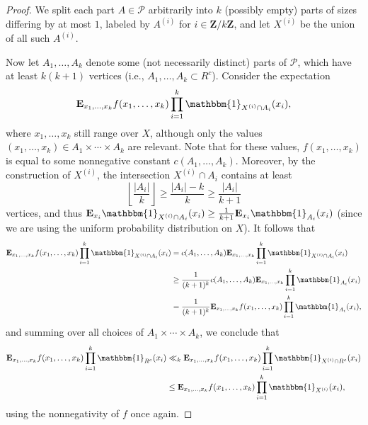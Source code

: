 \documentclass[reqno,11pt]{amsart}
\theoremstyle{definition}
\theoremstyle{remark}
\newtheorem*{remark}{Remark}
\numberwithin{equation}{section}
\newcommand{\Z}{\mathbf{Z}}
\newcommand{\E}{\mathbf{E}}
\newcommand{\mP}{\mathcal{P}}
\newcommand{\one}{\mathbbm{1}}
\begin{document}

\begin{proof}
We split each part $A \in \mP$ arbitrarily into $k$ (possibly empty) parts of sizes differing by at most $1$, labeled by $A^{(i)}$ for $i \in \Z/k\Z$, and let $X^{(i)}$ be the union of all such $A^{(i)}$.

Now let $A_1, \ldots, A_k$ denote some (not necessarily distinct) parts of $\mP$, which have at least $k(k+1)$ vertices (i.e., $A_1, \ldots, A_k \subset R^c$). Consider the expectation
\[
    \E_{x_1, \ldots, x_k} f(x_1,\ldots,x_k) \prod_{i=1}^k \one_{X^{(i)} \cap A_i}(x_i),
\]
where $x_1, \ldots, x_k$ still range over $X$, although only the values $(x_1, \ldots, x_k) \in A_1 \times \cdots \times A_k$ are relevant. Note that for these values, $f(x_1,\ldots,x_k)$ is equal to some nonnegative constant $c(A_1,\ldots,A_k)$. Moreover, by the construction of $X^{(i)}$, the intersection $X^{(i)} \cap A_i$ contains at least 
\[
    \left\lfloor \frac{|A_i|}{k} \right\rfloor \ge \frac{|A_i| - k}{k} \ge \frac{|A_i|}{k+1}
\]
vertices, and thus $\E_{x_i} \one_{X^{(i)} \cap A_i}(x_i) \ge \frac{1}{k+1} \E_{x_i} \one_{A_i}(x_i)$ (since we are using the uniform probability distribution on $X$). It follows that
\[
\begin{aligned}
    \E_{x_1,\ldots,x_k} f(x_1,\ldots,x_k) \prod_{i=1}^k \one_{X^{(i)} \cap A_i}(x_i)
    &= 
    c(A_1, \ldots, A_k) \E_{x_1,\ldots,x_k} \prod_{i=1}^k \one_{X^{(i)} \cap A_i}(x_i)
    \\ 
    &\ge 
    \frac{1}{(k+1)^k} c(A_1, \ldots, A_k) \E_{x_1,\ldots,x_k} \prod_{i=1}^k \one_{A_i}(x_i)
    \\
    &=
    \frac{1}{(k+1)^k} \E_{x_1,\ldots,x_k} f(x_1,\ldots,x_k) \prod_{i=1}^k \one_{A_i}(x_i),
\end{aligned}
\]
and summing over all choices of $A_1 \times \cdots \times A_k$, we conclude that
\[
\begin{aligned}
    \E_{x_1,\ldots,x_k} f(x_1,\ldots,x_k) \prod_{i=1}^k \one_{R^c}(x_i)
    &\ll_k 
    \E_{x_1,\ldots,x_k} f(x_1,\ldots,x_k) \prod_{i=1}^k \one_{X^{(i)} \cap R^c}(x_i)
    \\
    &\le 
    \E_{x_1,\ldots,x_k} f(x_1,\ldots,x_k) \prod_{i=1}^k \one_{X^{(i)}}(x_i),
\end{aligned}
\]
using the nonnegativity of $f$ once again.
\end{proof}
\end{document}
